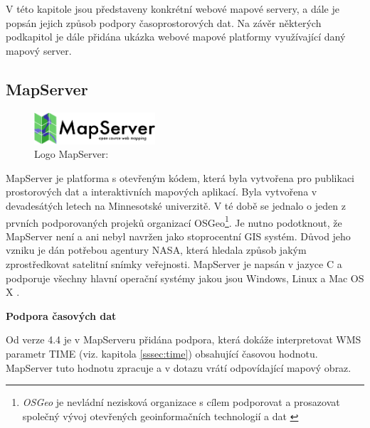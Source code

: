 V této kapitole jsou představeny konkrétní webové mapové servery,
a dále je popsán jejich způsob podpory časoprostorových dat. Na závěr některých podkapitol je dále přidána ukázka webové mapové platformy využívající daný mapový server.

\subsection{MapServer}
\label{sssec:mapserver}

\begin{figure}[h!]
	\centering
	\includegraphics[width=0.4\textwidth]{../img/mapserver-logo.png}
    \caption{Logo MapServer: \cite{mapserver_about}}
	\label{fig:mapserver-logo}
\end{figure}
\bigskip

MapServer je platforma s otevřeným kódem, která byla vytvořena pro
publikaci prostorových dat a interaktivních mapových aplikací. Byla
vytvořena v devadesátých letech na Minnesotské univerzitě. V té době se
jednalo o jeden z prvních podporovaných projeků organizací OSGeo\footnote{\textit{OSGeo} je nevládní nezisková organizace s cílem  podporovat a prosazovat společný vývoj otevřených geoinformačních technologií a dat \cite{osgeo}}. Je
nutno podotknout, že MapServer není a ani nebyl navržen jako
stoprocentní GIS systém. Důvod jeho vzniku je dán potřebou agentury
NASA, která hledala způsob jakým zprostředkovat satelitní snímky
veřejnosti. MapServer je napsán v jazyce C a podporuje všechny hlavní
operační systémy jakou jsou Windows, Linux a Mac OS X
\cite{mapserver_about}.

\bigskip
\noindent
\textbf{Podpora časových dat}

Od verze 4.4 je v MapServeru přidána podpora, která dokáže
interpretovat WMS parametr TIME (viz. kapitola \ref{sssec:time}) obsahující časovou hodnotu. MapServer
tuto hodnotu zpracuje a v dotazu vrátí odpovídající mapový obraz.

